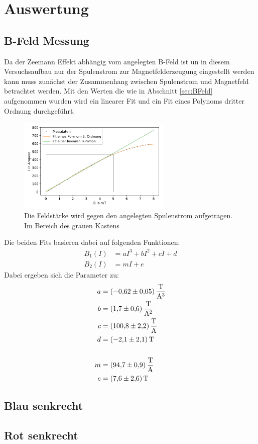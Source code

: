 \newpage
\section{Auswertung}
\label{sec:auswertung}
\subsection{B-Feld Messung}
Da der Zeemann Effekt abhängig vom angelegten B-Feld ist un in diesem Versuchsaufbau nur der Spulenstrom zur Magnetfelderzeugung eingestellt werden kann muss zunächst der Zusammenhang zwischen Spulenstrom und Magnetfeld betrachtet werden.
Mit den Werten die wie in Abschnitt \ref{sec:BFeld} aufgenommen wurden wird ein linearer Fit und ein Fit eines Polynoms dritter Ordnung durchgeführt.\\
\begin{figure}[ht]
    \center
    \includegraphics[width=0.65\textwidth]{plots/B_Feld.pdf}
    \caption{Die Feldstärke wird gegen den angelegten Spulenstrom aufgetragen. Im Bereich des grauen Kastens }
    \label{fig:B_Feld}
\end{figure}
Die beiden Fits basieren dabei auf folgenden Funktionen:
\begin{align*}
    B_1(I) &= aI^3+bI^2+cI+d\\
    B_2(I) &= mI+e
\end{align*}
Dabei ergeben sich die Parameter zu:
\begin{align*}
    a &= \SI[per-mode = fraction]{-0.62 +- 0.05}{\tesla \per \cubic \ampere}\\
    b &= \SI[per-mode = fraction]{1.7+-0.6}{\tesla \per \square \ampere}\\
    c &= \SI[per-mode = fraction]{100.8+-2.2}{\tesla \per \ampere}\\
    d &= \SI[per-mode = fraction]{-2.1+-2.1}{\tesla}\\
    \\
    m &= \SI[per-mode = fraction]{94.7+-0.9}{\tesla \per \ampere}\\
    e &= \SI[per-mode = fraction]{7.6+-2.6}{\tesla}\\ 
\end{align*}
\subsection{Blau senkrecht}
\subsection{Rot senkrecht}